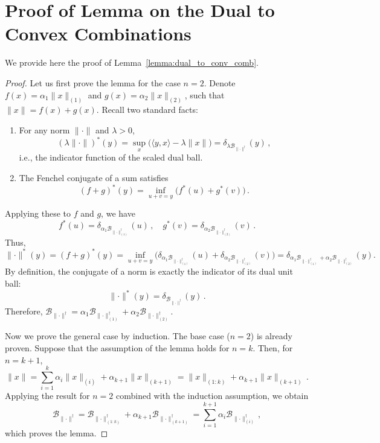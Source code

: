 \documentclass[a4paper,14pt,oneside]{extarticle}
\newcommand{\norm}[1]{\lVert #1\rVert}
\newcommand{\cB}{\mathcal{B}}
\newcommand{\lemmaref}[1]{Lemma~\ref{#1}}
\begin{document}
\section{Proof of Lemma on the Dual to Convex Combinations}\label{sec:proof_dual_conv_comb}

We provide here the proof of \lemmaref{lemma:dual_to_conv_comb}.

\begin{proof}
  Let us first prove the lemma for the case $n = 2$. Denote $f(x) = \alpha_1 \norm{x}_{(1)}$ and $g(x) = \alpha_2 \norm{x}_{(2)}$, such that $\norm{x} = f(x) + g(x)$. Recall two standard facts:
  \begin{enumerate}
    \item For any norm $\norm{\cdot}$ and $\lambda>0$,
          \[
            (\lambda \norm{\cdot})^*(y) =
            \sup_{x}\bigl( \langle y,x \rangle - \lambda \norm{x}\bigr)
            = \delta_{\lambda \cB_{\norm{\cdot}^\dagger}}(y)\,,
          \]
          i.e., the indicator function of the scaled dual ball.
    \item The Fenchel conjugate of a sum satisfies
          \[
            (f+g)^*(y) = \inf_{u+v=y} \bigl(f^*(u) + g^*(v)\bigr)\,.
          \]
  \end{enumerate}
  Applying these to $f$ and $g$, we have
  \[
    f^*(u) = \delta_{\alpha_1 \cB_{\norm{\cdot}_{(1)}^\dagger}}(u)\,,
    \quad
    g^*(v) = \delta_{\alpha_2 \cB_{\norm{\cdot}_{(2)}^\dagger}}(v)\,.
  \]
  Thus,
  \[
    \norm{\cdot}^*(y)
    = (f+g)^*(y)
    = \inf_{u+v=y}
    \bigl(
    \delta_{\alpha_1 \cB_{\norm{\cdot}_{(1)}^\dagger}}(u)
    +
    \delta_{\alpha_2 \cB_{\norm{\cdot}_{(2)}^\dagger}}(v)
    \bigr)
    =
    \delta_{\alpha_1 \cB_{\norm{\cdot}_{(1)}^\dagger}+\alpha_2 \cB_{\norm{\cdot}_{(2)}^\dagger}}(y).
  \]
  By definition, the conjugate of a norm is exactly the indicator of its dual unit ball:
  \[
  \norm{\cdot}^*(y) = \delta_{\cB_{\norm{\cdot}^\dagger}}(y)\,.
  \]
  Therefore, $\cB_{\norm{\cdot}^\dagger} = \alpha_1 \cB_{\norm{\cdot}_{(1)}^\dagger} + \alpha_2 \cB_{\norm{\cdot}_{(2)}^\dagger}$.

  Now we prove the general case by induction. The base case ($n=2$) is already proven. Suppose that the assumption of the lemma holds for $n = k$. Then, for $n = k + 1$,
  \[
  \norm{x} = \sum_{i = 1}^k \alpha_i \norm{x}_{(i)} + \alpha_{k + 1}\norm{x}_{(k + 1)} = \norm{x}_{(1:k)} + \alpha_{k + 1}\norm{x}_{(k + 1)}\,.
  \]
  Applying the result for $n=2$ combined with the induction assumption, we obtain
  \[
  \cB_{\norm{\cdot}^\dagger} = \cB_{\norm{\cdot}_{(1:k)}^\dagger} + \alpha_{k + 1} \cB_{\norm{\cdot}_{(k + 1)}^\dagger} = \sum_{i = 1}^{k + 1} \alpha_i \cB_{\norm{\cdot}_{(i)}^\dagger}\,,
  \]
  which proves the lemma.
\end{proof}
\end{document}
